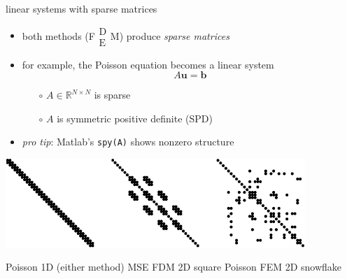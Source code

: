 \documentclass[hide notes,intlimits,usenames,dvipsnames]{beamer}
\newcommand{\RR}{\mathbb{R}}
\newcommand{\bb}{\mathbf{b}}
\newcommand{\bu}{\mathbf{u}}
\newcommand{\FM}{F$\begin{smallmatrix} \text{D} \\ \text{E} \end{smallmatrix}$M\xspace}
\begin{document}
\begin{frame}{linear systems with sparse matrices}
\begin{itemize}
\item both methods (\FM) produce \emph{sparse matrices}
\item for example, the Poisson equation becomes a linear system
    $$A \bu = \bb$$
    \vspace{-4mm}
	\begin{itemize}
	\item[$\circ$] $A\in\RR^{N\times N}$ is sparse
	\item[$\circ$] $A$ is symmetric positive definite (SPD)
	\end{itemize}
\item \emph{pro tip}: Matlab's \texttt{spy(A)} shows nonzero structure
\end{itemize}

\bigskip
\begin{center}
\includegraphics[width=0.85\textwidth]{figs/spythree}

\medskip
\scriptsize
Poisson 1D (either method) \quad MSE FDM 2D square \qquad Poisson FEM 2D snowflake

\end{center}
\end{frame}
\end{document}

